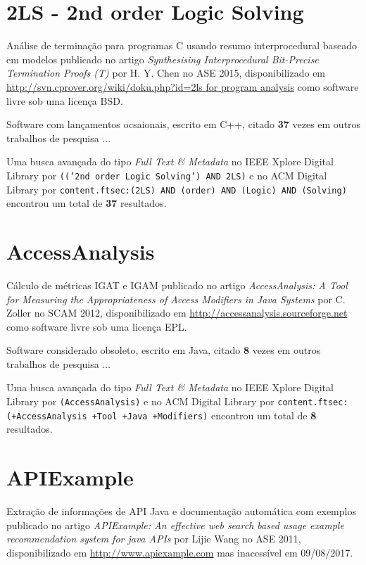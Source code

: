 

\label{softwares-summary}

\section{2LS - 2nd order Logic Solving}

Análise de terminação para programas C usando resumo interprocedural baseado em modelos
publicado no artigo {\it Synthesising Interprocedural Bit-Precise Termination Proofs (T)}
por H. Y. Chen
no ASE 2015,
disponibilizado em \url{http://svn.cprover.org/wiki/doku.php?id=2ls for program analysis}
como software livre
sob uma licença BSD.

Software com lançamentos ocsaionais,
escrito em C++,
citado {\bf 37} vezes em outros trabalhos de pesquisa ...

Uma busca avançada do tipo {\it Full Text \& Metadata} no IEEE Xplore Digital Library por
\texttt{(('2nd order Logic Solving') AND 2LS)}
e no ACM Digital Library por
\texttt{content.ftsec:(2LS) AND (order) AND (Logic) AND (Solving)}
encontrou um total de
{\bf 37}
resultados.

\section{AccessAnalysis}

Cálculo de métricas IGAT e IGAM
publicado no artigo {\it AccessAnalysis: A Tool for Measuring the Appropriateness of Access Modifiers in Java Systems}
por C. Zoller
no SCAM 2012,
disponibilizado em \url{http://accessanalysis.sourceforge.net}
como software livre
sob uma licença EPL.

Software considerado obsoleto,
escrito em Java,
citado {\bf 8} vezes em outros trabalhos de pesquisa ...

Uma busca avançada do tipo {\it Full Text \& Metadata} no IEEE Xplore Digital Library por
\texttt{(AccessAnalysis)}
e no ACM Digital Library por
\texttt{content.ftsec:(+AccessAnalysis +Tool +Java +Modifiers)}
encontrou um total de
{\bf 8}
resultados.

\section{APIExample}

Extração de informações de API Java e documentação automática com exemplos
publicado no artigo {\it APIExample: An effective web search based usage example recommendation system for java APIs}
por Lijie Wang
no ASE 2011,
disponibilizado em \url{http://www.apiexample.com}
mas inacessível em 09/08/2017.

